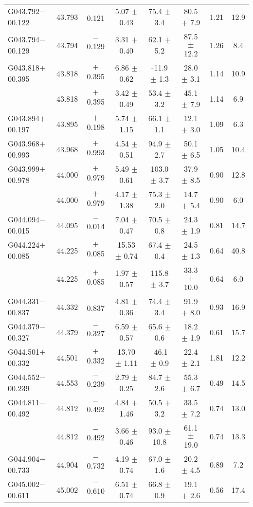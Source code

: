 \begin{ThreePartTable}
\begin{longtable}{lccccccc}
G043.792$-$00.122     &43.793&	$-$0.121	&5.07	$\pm$ 0.43	&75.4	$\pm$ 3.4	&80.5	$\pm$ 7.9	&1.21	&12.9\\
G043.794$-$00.129     &43.794&	$-$0.129	&3.31	$\pm$ 0.40	&62.1	$\pm$ 5.2	&87.5	$\pm$ 12.2	&1.26	&8.4\\
G043.818$+$00.395     &43.818&	$+$0.395	&6.86	$\pm$ 0.62	&-11.9	$\pm$ 1.3	&28.0	$\pm$ 3.1	&1.14	&10.9\\
                      &43.818&	$+$0.395	&3.42	$\pm$ 0.49	&53.4	$\pm$ 3.2	&45.1	$\pm$ 7.9	&1.14	&6.9\\
G043.894$+$00.197     &43.895&	$+$0.198	&5.74	$\pm$ 1.15	&66.1	$\pm$ 1.1	&12.1	$\pm$ 3.0	&1.09	&6.3\\
G043.968$+$00.993     &43.968&	$+$0.993	&4.54	$\pm$ 0.51	&94.9	$\pm$ 2.7	&50.1	$\pm$ 6.5	&1.05	&10.4\\
G043.999$+$00.978     &44.000&	$+$0.979	&5.49	$\pm$ 0.61	&103.0	$\pm$ 3.7	&37.9	$\pm$ 8.5	&0.90	&12.8\\
                      &44.000&	$+$0.979	&4.17	$\pm$ 1.38	&75.3	$\pm$ 2.0	&14.7	$\pm$ 5.4	&0.90	&6.0\\
G044.094$-$00.015     &44.095&	$-$0.014	&7.04	$\pm$ 0.47	&70.5	$\pm$ 0.8	&24.3	$\pm$ 1.9	&0.81	&14.7\\
G044.224$+$00.085     &44.225&	$+$0.085	&15.53	$\pm$ 0.74	&67.4	$\pm$ 0.4	&24.5	$\pm$ 1.3	&0.64	&40.8\\
                      &44.225&	$+$0.085	&1.97	$\pm$ 0.57	&115.8	$\pm$ 3.7	&33.3	$\pm$ 10.0	&0.64	&6.0\\
G044.331$-$00.837     &44.332&	$-$0.837	&4.81	$\pm$ 0.36	&74.4	$\pm$ 3.4	&91.9	$\pm$ 8.0	&0.93	&16.9\\
G044.379$-$00.327     &44.379&	$-$0.327	&6.59	$\pm$ 0.57	&65.6	$\pm$ 0.6	&18.2	$\pm$ 1.9	&0.61	&15.7\\
G044.501$+$00.332     &44.501&	$+$0.332	&13.70	$\pm$ 1.11	&-46.1	$\pm$ 0.9	&22.4	$\pm$ 2.1	&1.81	&12.2\\
G044.552$-$00.239     &44.553&	$-$0.239	&2.79	$\pm$ 0.25	&84.7	$\pm$ 2.6	&55.3	$\pm$ 6.7	&0.49	&14.5\\
G044.811$-$00.492     &44.812&	$-$0.492	&4.84	$\pm$ 1.46	&50.5	$\pm$ 3.2	&33.5	$\pm$ 7.2	&0.74	&13.0\\
                      &44.812&	$-$0.492	&3.66	$\pm$ 0.46	&93.0	$\pm$ 10.8	&61.1	$\pm$ 19.0	&0.74	&13.3\\
G044.904$-$00.733     &44.904&	$-$0.732	&4.19	$\pm$ 0.74	&67.0	$\pm$ 1.6	&20.2	$\pm$ 4.5	&0.89	&7.2\\
G045.002$-$00.611     &45.002&	$-$0.610	&6.51	$\pm$ 0.74	&66.8	$\pm$ 0.9	&19.1	$\pm$ 2.6	&0.56	&17.4\\

\end{longtable}
\end{ThreePartTable}
